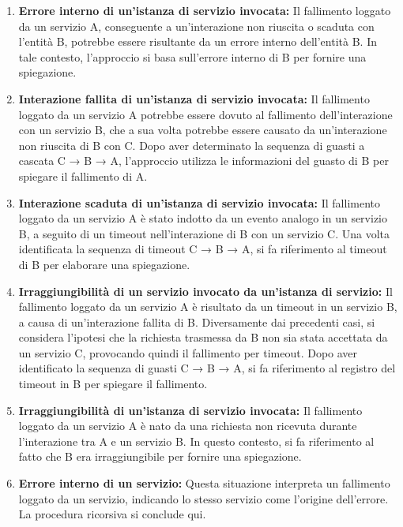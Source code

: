 \begin{enumerate}

\item \textbf{Errore interno di un'istanza di servizio invocata:} Il fallimento loggato da un servizio A, conseguente a un'interazione non riuscita o scaduta con l'entità B, potrebbe essere risultante da un errore interno dell'entità B. In tale contesto, l'approccio si basa sull'errore interno di B per fornire una spiegazione.

\item \textbf{Interazione fallita di un’istanza di servizio invocata:} Il fallimento loggato da un servizio A potrebbe essere dovuto al fallimento dell'interazione con un servizio B, che a sua volta potrebbe essere causato da un'interazione non riuscita di B con C. Dopo aver determinato la sequenza di guasti a cascata C → B → A, l'approccio utilizza le informazioni del guasto di B per spiegare il fallimento di A.

\item \textbf{Interazione scaduta di un'istanza di servizio invocata:} Il fallimento loggato da un servizio A è stato indotto da un evento analogo in un servizio B, a seguito di un timeout nell'interazione di B con un servizio C. Una volta identificata la sequenza di timeout C → B → A, si fa riferimento al timeout di B per elaborare una spiegazione.

\item \textbf{Irraggiungibilità di un servizio invocato da un'istanza di servizio:} Il fallimento loggato da un servizio A è risultato da un timeout in un servizio B, a causa di un'interazione fallita di B. Diversamente dai precedenti casi, si considera l'ipotesi che la richiesta trasmessa da B non sia stata accettata da un servizio C, provocando quindi il fallimento per timeout. Dopo aver identificato la sequenza di guasti C → B → A, si fa riferimento al registro del timeout in B per spiegare il fallimento.

\item \textbf{Irraggiungibilità di un'istanza di servizio invocata:} Il fallimento loggato da un servizio A è nato da una richiesta non ricevuta durante l'interazione tra A e un servizio B. In questo contesto, si fa riferimento al fatto che B era irraggiungibile per fornire una spiegazione.

\item \textbf{Errore interno di un servizio:} Questa situazione interpreta un fallimento loggato da un servizio, indicando lo stesso servizio come l'origine dell'errore. La procedura ricorsiva si conclude qui.


\end{enumerate}
